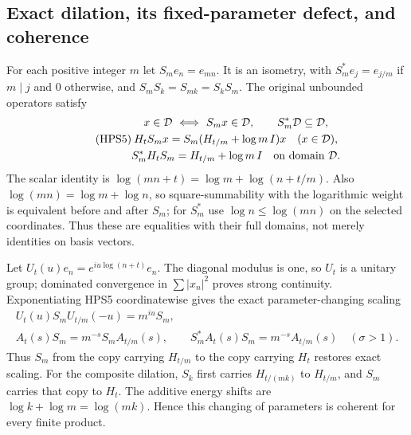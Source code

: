 \subsection{Exact dilation, its fixed-parameter defect, and coherence}

For each positive integer $m$ let $S_me_n=e_{mn}$.
It is an isometry, with
$S_m^*e_j=e_{j/m}$ if $m\mid j$ and $0$ otherwise,
and $S_mS_k=S_{mk}=S_kS_m$.
The original unbounded operators satisfy
\begin{equation}\tag{HPS5}
\begin{gathered}
 x\in\mathcal D\ \Longleftrightarrow\ S_mx\in\mathcal D,\qquad
 S_m^*\mathcal D\subseteq\mathcal D,\\
 H_tS_mx=S_m(H_{t/m}+\log m\,I)x
                         \quad(x\in\mathcal D),\\
 S_m^*H_tS_m=H_{t/m}+\log m\,I
                         \quad\hbox{on domain }\mathcal D.
\end{gathered}
\end{equation}
The scalar identity is
$\log(mn+t)=\log m+\log(n+t/m)$.
Also $\log(mn)=\log m+\log n$, so square-summability
with the logarithmic weight is equivalent before
and after $S_m$; for $S_m^*$ use
$\log n\le\log(mn)$ on the selected coordinates.
Thus these are equalities with their full domains,
not merely identities on basis vectors.

Let $U_t(u)e_n=e^{iu\log(n+t)}e_n$.
The diagonal modulus is one, so $U_t$ is a unitary
group; dominated convergence in
$\sum |x_n|^2$ proves strong continuity.
Exponentiating HPS5 coordinatewise gives the exact
parameter-changing scaling
\begin{equation}\tag{HPS6}
\begin{gathered}
 U_t(u)S_mU_{t/m}(-u)=m^{iu}S_m,\\
 A_t(s)S_m=m^{-s}S_mA_{t/m}(s),\qquad
 S_m^*A_t(s)S_m=m^{-s}A_{t/m}(s)
                                  \quad(\sigma>1).
\end{gathered}
\end{equation}
Thus $S_m$ from the copy carrying $H_{t/m}$ to the
copy carrying $H_t$ restores exact scaling.
For the composite dilation, $S_k$ first carries
$H_{t/(mk)}$ to $H_{t/m}$, and $S_m$ carries that
copy to $H_t$. The additive energy shifts are
$\log k+\log m=\log(mk)$. Hence this changing of
parameters is coherent for every finite product.

